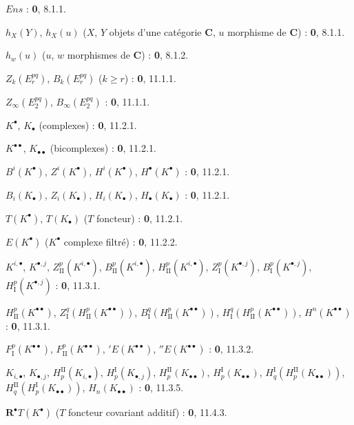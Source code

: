 \begin{flushleft}
$\boldsymbol{\mathit{Ens}}$ : \textbf{0}, 8.1.1.

$h_X(Y)$, $h_X(u)$ ($X$, $Y$ objets d'une catégorie $\boldsymbol{C}$, $u$ morphisme de
$\boldsymbol{C}$) : \textbf{0}, 8.1.1.

$h_w(u)$ ($u$, $w$ morphismes de $\boldsymbol{C}$) : \textbf{0}, 8.1.2.

$Z_k(E_r^{pq})$, $B_k(E_r^{pq})$ ($k\geq r$) : \textbf{0}, 11.1.1.

$Z_\infty(E_2^{pq})$, $B_\infty(E_2^{pq})$ : \textbf{0}, 11.1.1.

$K^\bullet$, $K_\bullet$ (complexes) : \textbf{0}, 11.2.1.

$K^{\bullet\bullet}$, $K_{\bullet\bullet}$ (bicomplexes) : \textbf{0}, 11.2.1.

$B^i(K^\bullet)$, $Z^i(K^\bullet)$, $H^i(K^\bullet)$,
$H^\bullet(K^\bullet)$ : \textbf{0}, 11.2.1.

$B_i(K_\bullet)$, $Z_i(K_\bullet)$, $H_i(K_\bullet)$,
$H_\bullet(K_\bullet)$ : \textbf{0}, 11.2.1.

$T(K^\bullet)$, $T(K_\bullet)$ ($T$ foncteur) : \textbf{0}, 11.2.1.

$E(K^\bullet)$ ($K^\bullet$ complexe filtré) : \textbf{0}, 11.2.2.

$K^{i,\bullet}$, $K^{\bullet,j}$, $Z_{\mathrm{II}}^p(K^{i,\bullet})$,
$B_{\mathrm{II}}^p(K^{i,\bullet})$, $H_{\mathrm{II}}^p(K^{i,\bullet})$,
$Z_{\mathrm I}^p(K^{\bullet,j})$, $B_{\mathrm I}^p(K^{\bullet,j})$,
$H_{\mathrm I}^p(K^{\bullet,j})$ : \textbf{0}, 11.3.1.

$H_{\mathrm{II}}^p(K^{\bullet\bullet})$,
$Z_{\mathrm I}^q(H_{\mathrm{II}}^p(K^{\bullet\bullet}))$,
$B_{\mathrm I}^q(H_{\mathrm{II}}^p(K^{\bullet\bullet}))$,
$H_{\mathrm I}^q(H_{\mathrm{II}}^p(K^{\bullet\bullet}))$,
$H^n(K^{\bullet\bullet})$ : \textbf{0}, 11.3.1.

$F_{\mathrm I}^p(K^{\bullet\bullet})$,
$F_{\mathrm{II}}^p(K^{\bullet\bullet})$, ${}'E(K^{\bullet\bullet})$,
${}''E(K^{\bullet\bullet})$ : \textbf{0}, 11.3.2.

$K_{i,\bullet}$, $K_{\bullet,j}$, $H_p^{\mathrm{II}}(K_{i,\bullet})$,
$H_p^{\mathrm I}(K_{\bullet,j})$, $H_p^{\mathrm{II}}(K_{\bullet\bullet})$,
$H_p^{\mathrm I}(K_{\bullet\bullet})$,
$H_q^{\mathrm I}(H_p^{\mathrm{II}}(K_{\bullet\bullet}))$,
$H_q^{\mathrm{II}}(H_p^{\mathrm I}(K_{\bullet\bullet}))$,
$H_n(K_{\bullet\bullet})$ : \textbf{0}, 11.3.5.

$\mathbf R^\bullet T(K^\bullet)$ ($T$ foncteur covariant additif) : \textbf{0}, 11.4.3.


\end{flushleft}
